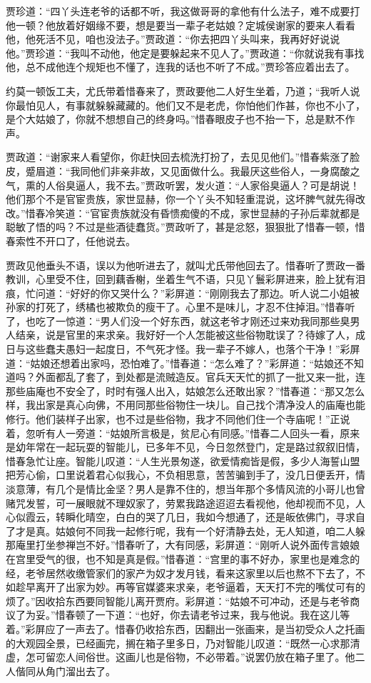 \documentclass[12pt,oneside]{book}
\begin{document}
贾珍道：“四丫头连老爷的话都不听，我这做哥哥的拿他有什么法子，难不成要打他一顿？他放着好姻缘不要，想是要当一辈子老姑娘？定城侯谢家的要来人看看他，他死活不见，咱也没法子。”贾政道：“你去把四丫头叫来，我再好好说说他。”贾珍道：“我叫不动他，他定是要躲起来不见人了。”贾政道：“你就说我有事找他，总不成他连个规矩也不懂了，连我的话也不听了不成。”贾珍答应着出去了。

约莫一顿饭工夫，尤氏带着惜春来了，贾政要他二人好生坐着，乃道；“我听人说你最怕见人，有事就躲躲藏藏的。他们又不是老虎，你怕他们作甚，你也不小了，是个大姑娘了，你就不想想自己的终身吗。”惜春眼皮子也不抬一下，总是默不作声。

贾政道：“谢家来人看望你，你赶快回去梳洗打扮了，去见见他们。”惜春紫涨了脸皮，蹙眉道：“我同他们非亲非故，又见面做什么。我最厌这些俗人，一身腐酸之气，熏的人俗臭逼人，我不去。”贾政听罢，发火道：“人家俗臭逼人？可是胡说！他们那个不是官宦贵族，家世显赫，你一个丫头不知轻重混说，这坏脾气就先得改改。”惜春冷笑道：“官宦贵族就没有昏愦痴傻的不成，家世显赫的子孙后辈就都是聪敏了悟的吗？不过是些酒徒蠢货。”贾政听了，甚是忿怒，狠狠批了惜春一顿，惜春索性不开口了，任他说去。

贾政见他垂头不语，误以为他听进去了，就叫尤氏带他回去了。惜春听了贾政一番教训，心里受不住，回到藕香榭，坐着生气不语，只见丫鬟彩屏进来，脸上犹有泪痕，忙问道：“好好的你又哭什么？”彩屏道：“刚刚我去了那边。听人说二小姐被孙家的打死了，绣橘也被欺负的瘦干了。心里不是味儿，才忍不住掉泪。”惜春听了，也吃了一惊道：“男人们没一个好东西，就这老爷才刚还过来劝我同那些臭男人结亲，说是官里的来求亲。我好好一个人怎能被这些俗物耽误了？待嫁了人，成日与这些蠢夫愚妇一起度日，不气死才怪。我一辈子不嫁人，也落个干净！”彩屏道：“姑娘还想着出家吗，恐怕难了。”惜春道：“怎么难了？”彩屏道：“姑娘还不知道吗？外面都乱了套了，到处都是流贼造反。官兵天天忙的抓了一批又来一批，连那些庙庵也不安全了，时时有强人出入，姑娘怎么还敢出家？”惜春道：“那又怎么样，我出家是真心向佛，不用同那些俗物住一块儿。自己找个清净没人的庙庵也能修行。他们装样子出家，也不过是些俗物，我才不同他们住一个寺庙呢！”正说着，忽听有人一旁道：“姑娘所言极是，贫尼心有同感。”惜春二人回头一看，原来是幼年常在一起玩耍的智能儿，已多年不见，今日忽然登门，定是路过叙叙旧情，惜春急忙让座。智能儿叹道：“人生光景匆遂，欲爱情痴皆是假，多少人海誓山盟把芳心偷，口里说着君心似我心，不负相思意，苦苦骗到手了，没几日便丢开，情淡意薄，有几个是情比金坚？男人是靠不住的，想当年那个多情风流的小哥儿也曾赌咒发誓，可一展眼就不理奴家了，劳累我路途迢迢去看视他，他却视而不见，人心似霞云，转瞬化晴空，白白的哭了几日，我如今想通了，还是皈依佛门，寻求自了才是真。姑娘何不同我一起修行呢，我有一个好清静去处，无人知道，咱二人躲那庵里打坐参禅岂不好。”惜春听了，大有同感，彩屏道：“刚听人说外面传言娘娘在宫里受气的很，也不知是真是假。”惜春道：“宫里的事不好办，家里也是难念的经，老爷居然收缴管家们的家产为奴才发月钱，看来这家里以后也熬不下去了，不如趁早离开了出家为妙。再等官媒婆来求亲，老爷逼着，天天打不完的嘴仗可有的烦了。”因收拾东西要同智能儿离开贾府。彩屏道：“姑娘不可冲动，还是与老爷商议了为妥。”惜春顿了一下道：“也好，你去请老爷过来，我与他说。我在这儿等着。”彩屏应了一声去了。惜春仍收拾东西，因翻出一张画来，是当初受众人之托画的大观园全景，已经画完，搁在箱子里多日，乃对智能儿叹道：“既然一心求那清虚，怎可留恋人间俗世。这画儿也是俗物，不必带着。”说罢仍放在箱子里了。他二人偕同从角门溜出去了。
\end{document}
